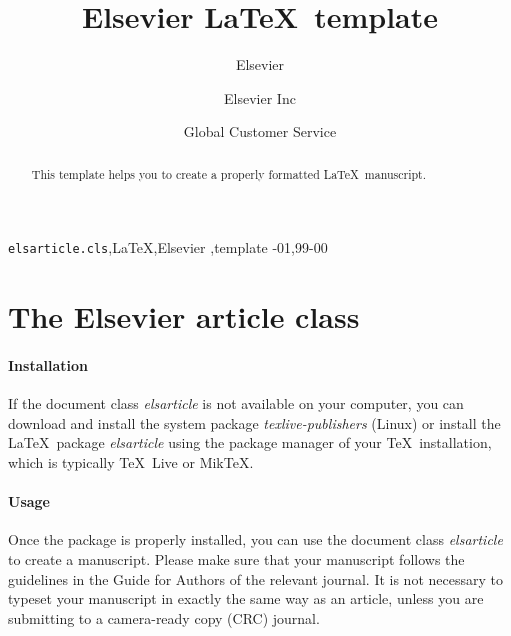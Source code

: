 \documentclass[review]{elsarticle}
\begin{document}
\begin{frontmatter}

\title{Elsevier \LaTeX\ template}

\author{Elsevier}
\address{Radarweg 29, Amsterdam}

\author[mymainaddress,mysecondaryaddress]{Elsevier Inc}

\author[mysecondaryaddress]{Global Customer Service}

\address[mymainaddress]{1600 John F Kennedy Boulevard, Philadelphia}
\address[mysecondaryaddress]{360 Park Avenue South, New York}

\begin{abstract}
This template helps you to create a properly formatted \LaTeX\ manuscript.
\end{abstract}

\begin{keyword}
\texttt{elsarticle.cls}\sep \LaTeX\sep Elsevier \sep template
-01\sep  99-00
\end{keyword}

\end{frontmatter}

\linenumbers

\section{The Elsevier article class}

\paragraph{Installation} If the document class \emph{elsarticle} is not available on your computer, you can download and install the system package \emph{texlive-publishers} (Linux) or install the \LaTeX\ package \emph{elsarticle} using the package manager of your \TeX\ installation, which is typically \TeX\ Live or Mik\TeX.

\paragraph{Usage} Once the package is properly installed, you can use the document class \emph{elsarticle} to create a manuscript. Please make sure that your manuscript follows the guidelines in the Guide for Authors of the relevant journal. It is not necessary to typeset your manuscript in exactly the same way as an article, unless you are submitting to a camera-ready copy (CRC) journal.
\end{document}

